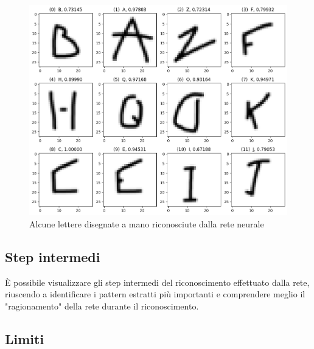 \documentclass[a4paper,12pt]{article}
\begin{document}
\begin{figure}
\centering
\includegraphics[width=1\linewidth]{images/drawn_letters_predicted.png}
\caption{Alcune lettere disegnate a mano riconosciute dalla rete neurale}
\label{drawn_letters_predicted}
\end{figure}

\subsection{Step intermedi}
È possibile visualizzare gli step intermedi del riconoscimento effettuato dalla rete, riuscendo a identificare i pattern estratti più importanti e comprendere meglio il "ragionamento" della rete durante il riconoscimento.

\subsection{Limiti}

\end{document}
